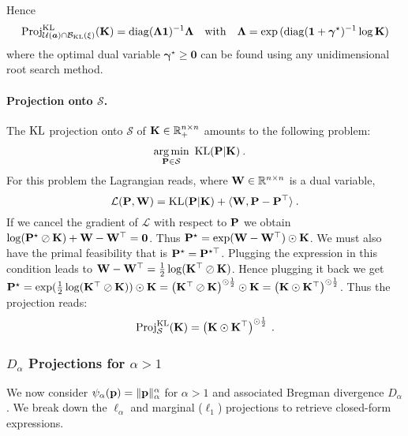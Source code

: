     Hence 
    \begin{align}
        \operatorname{Proj}^{\operatorname{KL}}_{{\mathcal{U}}(\bm{a}) \cap \mathcal{B}_{\operatorname{KL}}(\xi)}(\mathbf{K}) = \operatorname{diag}(\mathbf{\Lambda} \mathbf{1})^{-1} \mathbf{\Lambda} \quad \text{with} \quad \mathbf{\Lambda} = \exp{(\operatorname{diag}(\bm{1} + \bm{\gamma}^\star)^{-1} \log \mathbf{K})}
    \end{align}
    where the optimal dual variable $\bm{\gamma}^\star \bm{\geq} \bm{0}$ can be found using any unidimensional root search method.

    \paragraph{Projection onto $\mathcal{S}$.} The $\operatorname{KL}$ projection onto $\mathcal{S}$ of ${\mathbf{K}} \in \mathbb{R}_+^{n \times n}$ amounts to the following problem:
    \begin{align}
        \operatorname*{arg\,min}_{{\mathbf{P}} \in \mathcal{S}} \ &\operatorname{KL}({\mathbf{P}} | {\mathbf{K}}) \:.
    \end{align}
    For this problem the Lagrangian reads, where ${\mathbf{W}} \in \mathbb{R}^{n \times n}$ is a dual variable, 
    \begin{equation}
    \mathcal{L}({\mathbf{P}}, {\mathbf{W}}) = \operatorname{KL}({\mathbf{P}} | {\mathbf{K}}) + \langle {\mathbf{W}}, {\mathbf{P}} -{\mathbf{P}}^{\top} \rangle \:.
    \end{equation}
    If we cancel the gradient of $\mathcal{L}$ with respect to ${\mathbf{P}}$ we obtain $\log({\mathbf{P}}^\star \oslash {\mathbf{K}}) + {\mathbf{W}} - {\mathbf{W}}^\top = \bm{0}$. Thus ${\mathbf{P}}^\star = \exp( {\mathbf{W}}-{\mathbf{W}}^\top) \odot {\mathbf{K}}$. 
    We must also have the primal feasibility that is ${\mathbf{P}}^\star = {\mathbf{P}}^{\star \top}$. Plugging the expression in this condition leads to ${\mathbf{W}} - {\mathbf{W}}^\top= \frac{1}{2} \log({\mathbf{K}}^\top \oslash {\mathbf{K}})$. Hence plugging it back we get ${\mathbf{P}}^\star = \exp( \frac{1}{2} \log({\mathbf{K}}^\top \oslash {\mathbf{K}})) \odot {\mathbf{K}} = \left({\mathbf{K}}^\top \oslash {\mathbf{K}} \right)^{\odot \frac {1}{2}} \odot {\mathbf{K}} = \left({\mathbf{K}} \odot {\mathbf{K}}^{\top}\right)^{\odot \frac {1}{2}}$. Thus the projection reads:
    \begin{equation}
        \operatorname{Proj}^{\operatorname{KL}}_{\mathcal{S}}(\mathbf{K}) = \left({\mathbf{K}} \odot {\mathbf{K}}^{\top}\right)^{\odot \frac{1}{2}} \:.
    \end{equation}

    
    \subsubsection{$D_\alpha$ Projections for $\alpha > 1$}

    We now consider $\psi_{\alpha}({\mathbf{p}}) = \| {\mathbf{p}} \|_{\alpha}^{\alpha}$ for $\alpha>1$ and associated Bregman divergence $D_{\alpha}$.
    We break down the $\ell_{\alpha}$ and marginal ($\ell_1$) projections to retrieve closed-form expressions.

